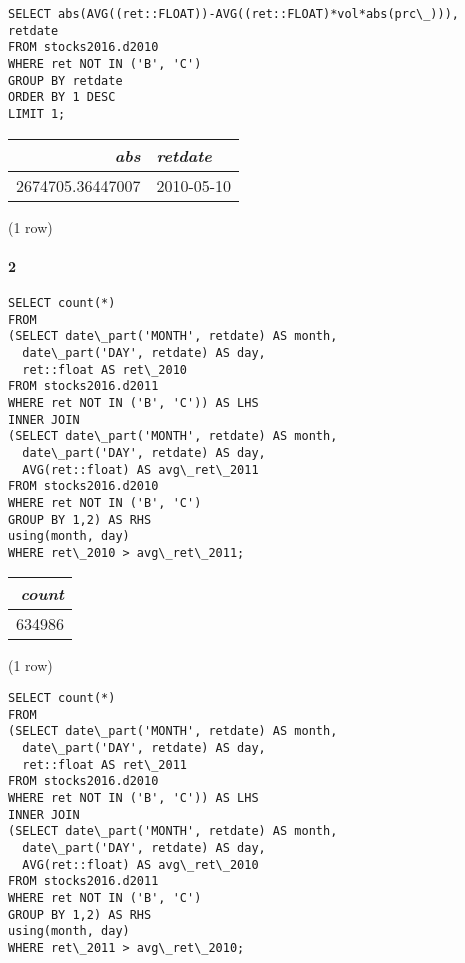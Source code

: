 \documentclass[]{article}
\let\oldparagraph\paragraph
\renewcommand{\paragraph}[1]{\oldparagraph{#1}\mbox{}}
\begin{document}
\color{blue}
\begin{verbatim}
SELECT abs(AVG((ret::FLOAT))-AVG((ret::FLOAT)*vol*abs(prc\_))), retdate
FROM stocks2016.d2010
WHERE ret NOT IN ('B', 'C')
GROUP BY retdate
ORDER BY 1 DESC
LIMIT 1;
\end{verbatim}
\color{black}

\begin{center}
\begin{tabular}{r | l}
\textit{abs} & \textit{retdate} \\
\hline
2674705.36447007 & 2010-05-10 \\
\end{tabular}

\noindent (1 row) \\
\end{center}

\paragraph{2}

\color{blue}
\begin{verbatim}
SELECT count(*)
FROM
(SELECT date\_part('MONTH', retdate) AS month,
  date\_part('DAY', retdate) AS day,
  ret::float AS ret\_2010
FROM stocks2016.d2011
WHERE ret NOT IN ('B', 'C')) AS LHS 
INNER JOIN
(SELECT date\_part('MONTH', retdate) AS month,
  date\_part('DAY', retdate) AS day,
  AVG(ret::float) AS avg\_ret\_2011
FROM stocks2016.d2010
WHERE ret NOT IN ('B', 'C')
GROUP BY 1,2) AS RHS
using(month, day)
WHERE ret\_2010 > avg\_ret\_2011;
\end{verbatim}
\color{black}

\begin{center}
\begin{tabular}{r}
\textit{count} \\
\hline
634986 \\
\end{tabular}

\noindent (1 row) \\
\end{center}

\color{blue}
\begin{verbatim}
SELECT count(*)
FROM
(SELECT date\_part('MONTH', retdate) AS month,
  date\_part('DAY', retdate) AS day,
  ret::float AS ret\_2011
FROM stocks2016.d2010
WHERE ret NOT IN ('B', 'C')) AS LHS 
INNER JOIN
(SELECT date\_part('MONTH', retdate) AS month,
  date\_part('DAY', retdate) AS day,
  AVG(ret::float) AS avg\_ret\_2010
FROM stocks2016.d2011
WHERE ret NOT IN ('B', 'C')
GROUP BY 1,2) AS RHS
using(month, day)
WHERE ret\_2011 > avg\_ret\_2010;
\end{verbatim}
\color{black}
\end{document}
